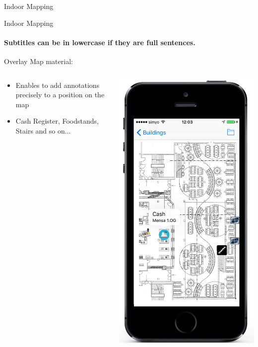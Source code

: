 \documentclass[11pt]{beamer}
\begin{document}
\begin{frame}{Indoor Mapping}
\end{frame}


\begin{frame}{Indoor Mapping}

\framesubtitle{Subtitles can be in lowercase if they are full sentences.}
Overlay Map material:

  \begin{columns}[T]
  \begin{column}{.6\textwidth}
  \begin{itemize}
    \item Enables to add annotations precisely to a position on the map
    \item Cash Register, Foodstands, Stairs and so on...
  \end{itemize}
  \end{column}
  \begin{column}{.4\textwidth}
  \includegraphics[scale=0.25]{mapmensainfo}

\end{column}
\end{columns}
\end{frame}
\end{document}
